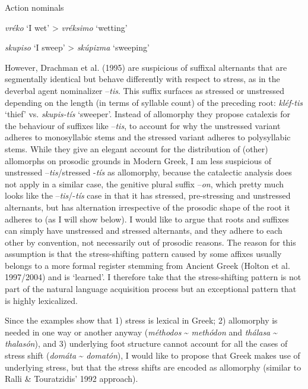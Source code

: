 \documentclass[a4paper]{article}
\begin{document}
\ea Action nominals

{
\textit{vréko} ‘I wet’ {\textgreater} \textit{vréksimo} ‘wetting’}

{
\textit{skupiso} ‘I sweep’ {\textgreater} \textit{skúpizma} ‘sweeping’}
\z


However, Drachman et al. (1995) are suspicious of suffixal alternants that are segmentally identical but behave differently with respect to stress, as in the deverbal agent nominalizer –\textit{tis}. This suffix surfaces as stressed or unstressed depending on the length (in terms of syllable count) of the preceding root: \textit{kléf-tis }‘thief’ vs. \textit{skupis-tís }‘sweeper’. Instead of allomorphy they propose catalexis for the behaviour of suffixes like –\textit{tis}, to account for why the unstressed variant adheres to monosyllabic stems and the stressed variant adheres to polysyllabic stems. While they give an elegant account for the distribution of (other) allomorphs on prosodic grounds in Modern Greek, I am less suspicious of unstressed –\textit{tis}/stressed -\textit{tís} as allomorphy, because the catalectic analysis does not apply in a similar case, the genitive plural suffix –\textit{on}, which pretty much looks like the –\textit{tis}/-\textit{tís} case in that it has stressed, pre-stressing and unstressed alternants, but has alternation irrespective of the prosodic shape of the root it adheres to (as I will show below). I would like to argue that roots and suffixes can simply have unstressed and stressed alternants, and they adhere to each other by convention, not necessarily out of prosodic reasons. The reason for this assumption is that the stress-shifting pattern caused by some affixes usually belongs to a more formal register stemming from Ancient Greek (Holton et al. 1997/2004) and is ‘learned’. I therefore take that the stress-shifting pattern is not part of the natural language acquisition process but an exceptional pattern that is highly lexicalized.

Since the examples show that 1) stress is lexical in Greek; 2) allomorphy is needed in one way or another anyway (\textit{méthodos} \~{} \textit{methódon} and \textit{thálasa} \~{} \textit{thalasón}), and 3) underlying foot structure cannot account for all the cases of stress shift (\textit{domáta} \~{} \textit{domatón}), I would like to propose that Greek makes use of underlying stress, but that the stress shifts are encoded as allomorphy (similar to Ralli \& Touratzidis’ 1992 approach).
\end{document}
